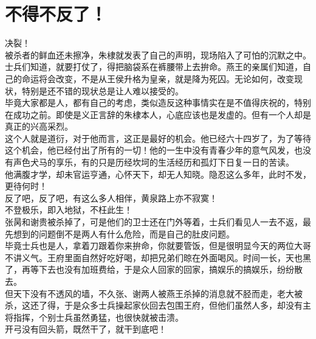 \section{不得不反了！}
\ifnum{}
	\begin{multicols}{\theparacolNo}
\fi
决裂！\\

被杀者的鲜血还未擦净，朱棣就发表了自己的声明，现场陷入了可怕的沉默之中。\\

士兵们知道，就要打仗了，得把脑袋系在裤腰带上去拚命。燕王的亲属们知道，自己的命运将会改变，不是从王侯升格为皇亲，就是降为死囚。无论如何，改变现状，特别是还不错的现状总是让人难以接受的。\\

毕竟大家都是人，都有自己的考虑，类似造反这种事情实在是不值得庆祝的，特别在成功之前。即使是义正言辞的朱棣本人，心底应该也是发虚的。但有一个人却是真正的兴高采烈。\\

这个人就是道衍，对于他而言，这正是最好的机会。他已经六十四岁了，为了等待这个机会，他已经付出了所有的一切！他的一生中没有青春少年的意气风发，也没有声色犬马的享乐，有的只是历经坎坷的生活经历和孤灯下日复一日的苦读。\\

他满腹才学，却未官运亨通，心怀天下，却无人知晓。隐忍这么多年，此时不发，更待何时！\\

反了吧，反了吧，有这么多人相伴，黄泉路上亦不寂寞！\\

不登极乐，即入地狱，不枉此生！\\

张昺和谢贵被杀掉了，可是他们的卫士还在门外等着，士兵们看见人一去不返，最先想到的问题倒不是两人有什么危险，而是自己的肚皮问题。\\

毕竟士兵也是人，拿着刀跟着你来拚命，你就要管饭，但是很明显今天的两位大哥不讲义气。王府里面自然好吃好喝，却把兄弟们晾在外面喝风。时间一长，天也黑了，再等下去也没有加班费给，于是众人回家的回家，搞娱乐的搞娱乐，纷纷散去。\\

但天下没有不透风的墙，不久张、谢两人被燕王杀掉的消息就不胫而走，老大被杀，这还了得，于是众多士兵操起家伙回去包围王府，但他们虽然人多，却没有主将指挥，个别士兵虽然勇猛，也很快就被击溃。\\

开弓没有回头箭，既然干了，就干到底吧！\\


\end{multicols}
